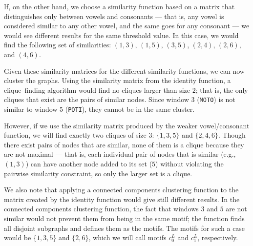     If, on the other hand, we choose a similarity function based on
    a matrix that distinguishes only between vowels and consonants ---
    that is, any vowel is considered similar to any other vowel, and
    the same goes for any consonant --- we would see different results
    for the same threshold value.  In this case, we would find the
    following set of similarities: $(1, 3)$, $(1, 5)$, $(3, 5)$,
    $(2, 4)$, $(2, 6)$, and $(4, 6)$.

    Given these similarity matrices for the different similarity
    functions, we can now cluster the graphs.  Using the similarity
    matrix from the identity function, a clique--finding algorithm
    would find no cliques larger than size $2$; that is, the only
    cliques that exist are the pairs of similar nodes.  Since window
    $3$ (\texttt{MOTO}) is not similar to window $5$ (\texttt{POTI}),
    they cannot be in the same cluster.

    However, if we use the similarity matrix produced by the weaker
    vowel/consonant function, we will find exactly two cliques of size
    $3$: $\{1, 3, 5\}$ and $\{2, 4, 6\}$.  Though there exist pairs of nodes
    that are similar, none of them is a clique because they are not
    maximal --- that is, each individual pair of nodes that is similar
    (e.g., $(1, 3)$) can have another node added to its set ($5$) without
    violating the pairwise similarity constraint, so only the larger
    set is a clique.

    We also note that applying a connected components clustering function
    to the matrix created by the identity function would give still
    different results.  In the connected components clustering function, the
    fact that windows $3$ and $5$ are not similar would not prevent
    them from being in the same motif; the function finds all disjoint
    subgraphs and defines them as the motifs.  The motifs for such
    a case would be $\{1, 3, 5\}$ and $\{2, 6\}$, which we will call motifs
    $c_0^L$ and $c_1^L$, respectively.


